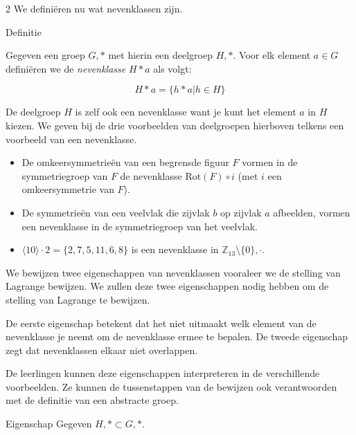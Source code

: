 \begin{multicols}{2}
We definiëren nu wat nevenklassen zijn.


\begin{kader}{Definitie}{}

    Gegeven een groep $G,*$ met hierin een deelgroep $H,*$. Voor elk element $a\in G$ definiëren we de \emph{nevenklasse} $H*a$ als volgt:

    $$H*a=\{h*a|h\in H\}$$
    
\end{kader}

De deelgroep $H$ is zelf ook een nevenklasse want je kunt het element $a$ in $H$ kiezen. We geven bij de drie voorbeelden van deelgroepen hierboven telkens een voorbeeld van een nevenklasse.

\begin{itemize}
    \item De omkeersymmetrieën van een begrensde figuur $F$ vormen in de symmetriegroep van $F$ de nevenklasse $\text{Rot}(F) \circ i $ (met $i$ een omkeersymmetrie van $F$).
    \item De symmetrieën van een veelvlak die zijvlak $b$ op zijvlak $a$ afbeelden, vormen een nevenklasse in de symmetriegroep van het veelvlak.
    \item $\langle10\rangle\cdot 2 = \{ 2, 7, 5, 11, 6, 8 \}$ is een nevenklasse in $\mathbb{Z}_{13}\setminus\{0\}, \cdot$.
\end{itemize}

We bewijzen twee eigenschappen van nevenklassen vooraleer we de stelling van Lagrange bewijzen. We zullen deze twee eigenschappen nodig hebben om de stelling van Lagrange te bewijzen. 

De eerste eigenschap betekent dat het niet uitmaakt welk element van de nevenklasse je neemt om de nevenklasse ermee te bepalen. De tweede eigenschap zegt dat nevenklassen elkaar niet overlappen. 
\begin{center}


\end{center}
De leerlingen kunnen deze eigenschappen interpreteren in de verschillende voorbeelden. Ze kunnen de tussenstappen van de bewijzen ook verantwoorden met de definitie van een abstracte groep.

\begin{kader}{Eigenschap}{}
    Gegeven $H,*\subset G,*$.
    

\end{kader}
\end{multicols}
